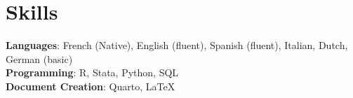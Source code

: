 \documentclass[12pt]{article}
\makeatletter
\newcommand{\CVSubheading}[4]{
  \vspace{-2pt}\item
    \begin{tabular*}{0.97\textwidth}[t]{l@{\extracolsep{\fill}}r}
      \textbf{#1} & #2 \\
      \small#3 & \small #4 \\
    \end{tabular*}\vspace{-7pt}
}
\newcommand{\CVSubHeadingListStart}{\begin{itemize}[leftmargin=0.5cm, label={}]}
\newcommand{\CVSubHeadingListEnd}{\end{itemize}}
\makeatother
\begin{document}
 



%


\section{Skills}
 \begin{itemize}[leftmargin=0.5cm, label={}]
    \small{\item{
     \textbf{Languages}{: French (Native), English (fluent), Spanish (fluent), Italian, Dutch, German (basic)} \\
     \textbf{Programming}{: R, Stata, Python, SQL} \\
     \textbf{Document Creation}{: Quarto, \LaTeX{}} 
    }}
 \end{itemize}
    
\end{document}
